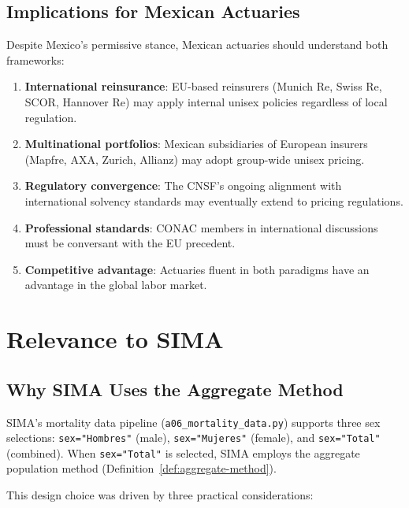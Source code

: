 \documentclass[12pt,a4paper]{article}
\begin{document}
\subsection{Implications for Mexican Actuaries}
\label{subsec:implications-mexico}

Despite Mexico's permissive stance, Mexican actuaries should understand both frameworks:

\begin{enumerate}
  \item \textbf{International reinsurance}: EU-based reinsurers (Munich Re, Swiss Re, SCOR, Hannover Re) may apply internal unisex policies regardless of local regulation.
  \item \textbf{Multinational portfolios}: Mexican subsidiaries of European insurers (Mapfre, AXA, Zurich, Allianz) may adopt group-wide unisex pricing.
  \item \textbf{Regulatory convergence}: The CNSF's ongoing alignment with international solvency standards may eventually extend to pricing regulations.
  \item \textbf{Professional standards}: CONAC members in international discussions must be conversant with the EU precedent.
  \item \textbf{Competitive advantage}: Actuaries fluent in both paradigms have an advantage in the global labor market.
\end{enumerate}


\section{Relevance to SIMA}
\label{sec:sima}

\subsection{Why SIMA Uses the Aggregate Method}
\label{subsec:sima-aggregate}

SIMA's mortality data pipeline (\texttt{a06\_mortality\_data.py}) supports three
sex selections: \texttt{sex="Hombres"} (male), \texttt{sex="Mujeres"} (female),
and \texttt{sex="Total"} (combined). When \texttt{sex="Total"} is selected,
SIMA employs the aggregate population method (Definition~\ref{def:aggregate-method}).

This design choice was driven by three practical considerations:
\end{document}
